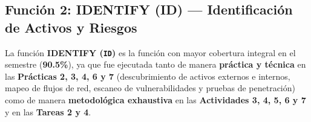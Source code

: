 \documentclass[letterpaper,11pt]{article}
\begin{document}
\subsection{Función 2: IDENTIFY (ID) --- Identificación de Activos y Riesgos}

La función \textbf{IDENTIFY (\texttt{ID})} es la función con mayor cobertura integral en el semestre (\textbf{90.5\%}), ya que fue ejecutada tanto de manera \textbf{práctica y técnica} en las \textbf{Prácticas 2, 3, 4, 6 y 7} (descubrimiento de activos externos e internos, mapeo de flujos de red, escaneo de vulnerabilidades y pruebas de penetración) como de manera \textbf{metodológica exhaustiva} en las \textbf{Actividades 3, 4, 5, 6 y 7} y en las \textbf{Tareas 2 y 4}.
\end{document}
